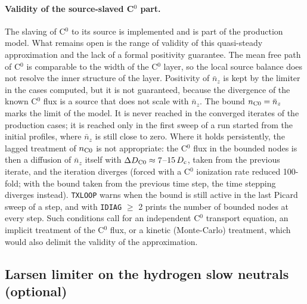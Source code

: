 \documentclass[11pt]{article}
\def\r#1{{\rm#1}}
\def\nnz{\bar{n}_{z}}
\begin{document}
\paragraph{Validity of the source-slaved C$^0$ part.}
The slaving of C$^0$ to its source is implemented and is part of the production
model.  What remains open is the range of validity of this quasi-steady
approximation and the lack of a formal positivity guarantee.  The mean free path
of C$^0$ is comparable to the width of the C$^0$ layer, so the local source
balance does not resolve the inner structure of the layer.  Positivity of $\nnz$
is kept by the limiter in the cases computed, but it is not guaranteed, because
the divergence of the known C$^0$ flux is a source that does not scale with $\nnz$.
The bound $n_\r{C0}=\nnz$ marks the limit of the model.  It is never reached in
the converged iterates of the production cases; it is reached only in the first
sweep of a run started from the initial profiles, where $\nnz$ is still close to
zero.  Where it holds persistently, the lagged treatment of $n_\r{C0}$ is not
appropriate: the C$^0$ flux in the bounded nodes is then a diffusion of $\nnz$ itself
with $\Delta D_\r{C0}\approx 7$--$15\,D_\r{c}$, taken from the previous iterate, and the
iteration diverges (forced with a C$^0$ ionization rate reduced 100-fold; with the
bound taken from the previous time step, the time stepping diverges instead).
\texttt{TXLOOP} warns when the bound is still active in the last Picard sweep of a
step, and with \texttt{IDIAG} $\ge$ 2 prints the number of bounded nodes at every
step.  Such conditions call for an independent C$^0$ transport equation, an
implicit treatment of the C$^0$ flux, or a kinetic (Monte-Carlo) treatment, which
would also delimit the validity of the approximation.

\subsection{Larsen limiter on the hydrogen slow neutrals (optional)}
\end{document}
